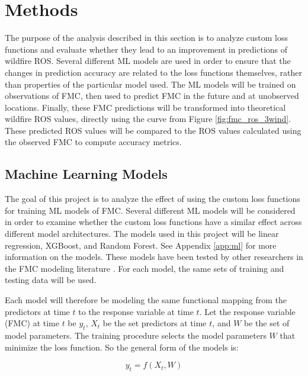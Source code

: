 \documentclass[11pt]{article}%
\begin{document}
\section{Methods}

The purpose of the analysis described in this section is to analyze custom loss functions and evaluate whether they lead to an improvement in predictions of wildfire ROS. Several different ML models are used in order to ensure that the changes in prediction accuracy are related to the loss functions themselves, rather than properties of the particular model used. The ML models will be trained on observations of FMC, then used to predict FMC in the future and at unobserved locations. Finally, these FMC predictions will be transformed into theoretical wildfire ROS values, directly using the curve from Figure \ref{fig:fmc_ros_3wind}. These predicted ROS values will be compared to the ROS values calculated using the observed FMC to compute accuracy metrics.

\subsection{Machine Learning Models}
\label{sec:ml}

The goal of this project is to analyze the effect of using the custom loss functions for training ML models of FMC. Several different ML models will be considered in order to examine whether the custom loss functions have a similar effect across different model architectures. The models used in this project will be linear regression, XGBoost, and Random Forest. See Appendix \ref{app:ml} for more information on the models. These models have been tested by other researchers in the FMC modeling literature \citep{Lee-2020-EFM,McCandless-2020-EWS, Schreck-2023-MLV}. For each model, the same sets of training and testing data will be used. 

Each model will therefore be modeling the same functional mapping from the predictors at time $t$ to the response variable at time $t$. Let the response variable (FMC) at time $t$ be $y_t$, $X_t$ be the set predictors at time $t$, and $W$ be the set of model parameters. The training procedure selects the model parameters $W$ that minimize the loss function. So the general form of the models is:

\[
y_t = f(X_t, W)
\]
\end{document}
